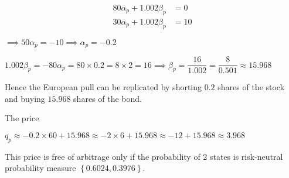 \documentclass{article}
\begin{document}
\begin{align*} 
    80\alpha_{p} + 1.002\beta_{p} &=  0 \\ 
    30\alpha_{p} + 1.002\beta_{p} &=  10
\end{align*}

$\implies 50\alpha_{p}=-10\implies\alpha_{p}=-0.2$

$1.002\beta_{p}=-80\alpha_{p}=80\times0.2=8\times2=16\implies\beta_{p}=\dfrac{16}{1.002}=\dfrac{8}{0.501}\approx15.968$

Hence the European pull can be replicated by shorting $0.2$ shares of the stock and buying $15.968$ shares of the bond.

The price

$q_{p}\approx-0.2\times60+15.968\approx-2\times6+15.968\approx-12+15.968\approx3.968$

This price is free of arbitrage only if the probability of 2 states is risk-neutral probability measure $\left\{0.6024, 0.3976\right\}$.
\end{document}
